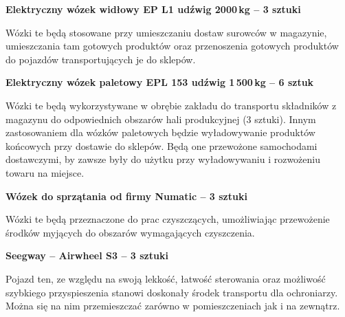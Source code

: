 \textbf{Elektryczny wózek widłowy \textsf{EP L1} udźwig 2000\,kg -- 3 sztuki}

Wózki te będą stosowane przy umieszczaniu dostaw surowców w magazynie, umieszczania tam gotowych produktów oraz przenoszenia gotowych produktów do pojazdów transportujących je do sklepów.\vspace{\baselineskip}

\textbf{Elektryczny wózek paletowy \textsf{EPL 153} udźwig 1\,500\,kg -- 6 sztuk}

Wózki te będą wykorzystywane w obrębie zakładu do transportu składników z magazynu do odpowiednich obszarów hali produkcyjnej (3 sztuki). Innym zastosowaniem dla wózków paletowych będzie wyładowywanie produktów końcowych przy dostawie do sklepów. Będą one przewożone samochodami dostawczymi, by zawsze były do użytku przy wyładowywaniu i rozwożeniu towaru na miejsce.\vspace{\baselineskip}

\textbf{Wózek do sprzątania od firmy \textsf{Numatic} -- 3 sztuki}

Wózki te będą przeznaczone do prac czyszczących, umożliwiając przewożenie środków myjących do obszarów wymagających czyszczenia.\vspace{\baselineskip}

\textbf{Seegway -- \textsf{Airwheel S3} -- 3 sztuki}

Pojazd ten, ze względu na swoją lekkość, łatwość sterowania oraz możliwość szybkiego przyspieszenia stanowi doskonały środek transportu dla ochroniarzy. Można się na nim przemieszczać zarówno w pomieszczeniach jak i na zewnątrz.\vspace{\baselineskip}
